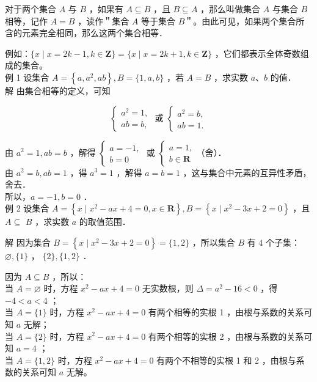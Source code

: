 \documentclass[10pt]{article}
\begin{document}
对于两个集合 \(A\) 与 \(B\) ，如果有 \(A \subseteq B\) ，且 \(B \subseteq A\) ，那么叫做集合 \(A\) 与集合 \(B\) 相等，记作 \(A=B\) ，读作＂集合 \(A\) 等于集合 \(B\)＂。由此可见，如果两个集合所含的元素完全相同，那么这两个集合相等．

例如：\(\{x \mid x=2 k-1, k \in \mathbf{Z}\}=\{x \mid x=2 k+1, k \in \mathbf{Z}\}\) ，它们都表示全体奇数组成的集合。\\
例 1 设集合 \(A=\left\{a, a^{2}, a b\right\}, B=\{1, a, b\}\) ，若 \(A=B\) ，求实数 \(a 、 b\) 的值．\\
解 由集合相等的定义，可知

\[
\left\{\begin{array} { l } 
{ a ^ { 2 } = 1 , } \\
{ a b = b , }
\end{array} \text { 或 } \left\{\begin{array}{l}
a^{2}=b, \\
a b=1 .
\end{array}\right.\right.
\]

由 \(a^{2}=1, a b=b\) ，解得 \(\left\{\begin{array}{l}a=-1, \\ b=0\end{array}\right.\) 或 \(\left\{\begin{array}{l}a=1, \\ b \in \mathbf{R}\end{array}\right.\)（舍）．\\
由 \(a^{2}=b, a b=1\) ，得 \(a^{3}=1\) ，解得 \(a=b=1\) ，这与集合中元素的互异性矛盾，舍去．\\
所以，\(a=-1, b=0\) ．\\
例 2 设集合 \(A=\left\{x \mid x^{2}-a x+4=0, x \in \mathbf{R}\right\}, B=\left\{x \mid x^{2}-3 x+2=0\right\}\) ，且 \(A \subseteq\) \(B\) ，求实数 \(a\) 的取值范围．

解 因为集合 \(B=\left\{x \mid x^{2}-3 x+2=0\right\}=\{1,2\}\) ，所以集合 \(B\) 有 4 个子集：\(\varnothing,\{1\}\) ， \(\{2\},\{1,2\}\) ．

因为 \(A \subseteq B\) ，所以：\\
当 \(A=\varnothing\) 时，方程 \(x^{2}-a x+4=0\) 无实数根，则 \(\Delta=a^{2}-16<0\) ，得 \(-4<a<4\) ；\\
当 \(A=\{1\}\) 时，方程 \(x^{2}-a x+4=0\) 有两个相等的实根 1 ，由根与系数的关系可知 \(a\) 无解；\\
当 \(A=\{2\}\) 时，方程 \(x^{2}-a x+4=0\) 有两个相等的实根 2 ，由根与系数的关系可知 \(a=4\) ；\\
当 \(A=\{1,2\}\) 时，方程 \(x^{2}-a x+4=0\) 有两个不相等的实根 1 和 2 ，由根与系数的关系可知 \(a\) 无解。
\end{document}
